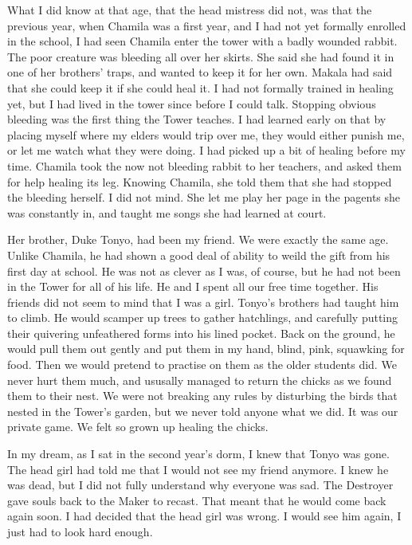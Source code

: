 \documentclass{article}
\begin{document}
What I did know at that age, that the head mistress did not, was that the previous year, when Chamila was a first year, and I had not yet formally enrolled in the school, I had seen Chamila enter the tower with a badly wounded rabbit. The poor creature was bleeding all over her skirts. She said she had found it in one of her brothers' traps, and wanted to keep it for her own. Makala had said that she could keep it if she could heal it. I had not formally trained in healing yet, but I had lived in the tower since before I could talk. Stopping obvious bleeding was the first thing the Tower teaches. I had learned early on that by placing myself where my elders would trip over me, they would either punish me, or let me watch what they were doing. I had picked up a bit of healing before my time. Chamila took the now not bleeding rabbit to her teachers, and asked them for help healing its leg. Knowing Chamila, she told them that she had stopped the bleeding herself. I did not mind. She let me play her page in the pagents she was constantly in, and taught me songs she had learned at court. 

Her brother, Duke Tonyo, had been my friend. We were exactly the same age. Unlike Chamila, he had shown a good deal of ability to weild the gift from his first day at school. He was not as clever as I was, of course, but he had not been in the Tower for all of his life. He and I spent all our free time together. His friends did not seem to mind that I was a girl. Tonyo's brothers had taught him to climb. He would scamper up trees to gather hatchlings, and carefully putting their quivering unfeathered forms into his lined pocket. Back on the ground, he would pull them out gently and put them in my hand, blind, pink, squawking for food. Then we would pretend to practise on them as the older students did. We never hurt them much, and ususally managed to return the chicks as we found them to their nest. We were not breaking any rules by disturbing the birds that nested in the Tower's garden, but we never told anyone what we did. It was our private game. We felt so grown up healing the chicks. 

In my dream, as I sat in the second year's dorm, I knew that Tonyo was gone. The head girl had told me that I would not see my friend anymore. I knew he was dead, but I did not fully understand why everyone was sad. The Destroyer gave souls back to the Maker to recast. That meant that he would come back again soon. I had decided that the head girl was wrong. I would see him again, I just had to look hard enough. 
\end{document}

